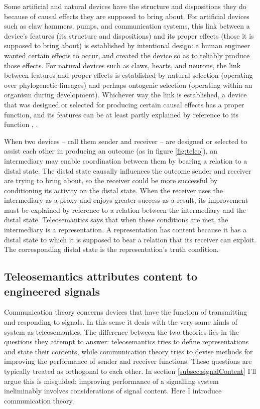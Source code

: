 \documentclass[12pt]{article}
\begin{document}


Some artificial and natural devices have the structure and dispositions they do because of causal effects they are supposed to bring about.
For artificial devices such as claw hammers, pumps, and communication systems, this link between a device's features (its structure and dispositions) and its proper effects (those it is supposed to bring about) is established by intentional design: a human engineer wanted certain effects to occur, and created the device so as to reliably produce those effects.
For natural devices such as claws, hearts, and neurons, the link between features and proper effects is established by natural selection (operating over phylogenetic lineages) and perhaps ontogenic selection (operating within an organism during development).
Whichever way the link is established, a device that was designed or selected for producing certain causal effects has a proper function, and its features can be at least partly explained by reference to its function \citep[$\S\S$1-2]{millikan1984language}, \citep[$\S$2]{millikan1993white}.

When two devices -- call them sender and receiver -- are designed or selected to assist each other in producing an outcome (as in figure \ref{fig:teleo}), an intermediary may enable coordination between them by bearing a relation to a distal state.
The distal state causally influences the outcome sender and receiver are trying to bring about, so the receiver could be more successful by conditioning its activity on the distal state.
When the receiver uses the intermediary as a proxy and enjoys greater success as a result, its improvement must be explained by reference to a relation between the intermediary and the distal state.
Teleosemantics says that when these conditions are met, the intermediary is a representation.
A representation has content because it has a distal state to which it is supposed to bear a relation that its receiver can exploit.
The corresponding distal state is the representation's truth condition.


\subsection{Teleosemantics attributes content to engineered signals}

Communication theory concerns devices that have the function of transmitting and responding to signals.
In this sense it deals with the very same kinds of system as teleosemantics.
The difference between the two theories lies in the questions they attempt to answer: teleosemantics tries to define representations and state their contents, while communication theory tries to devise methods for improving the performance of sender and receiver functions.
These questions are typically treated as orthogonal to each other.
In section \ref{subsec:signalContent} I'll argue this is misguided: improving performance of a signalling system ineliminably involves considerations of signal content.
Here I introduce communication theory.
\end{document}
